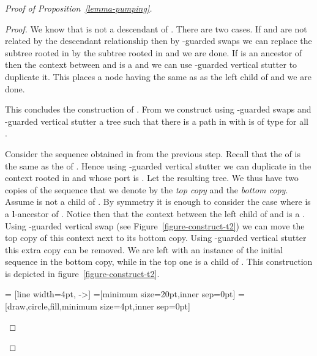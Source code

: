 \begin{proof}[Proof of Proposition~\ref{lemma-pumping}]
\begin{proof}
  We know that  is not a descendant of . There are two cases. If  and 
  are not related by the descendant relationship then by -guarded swaps we
  can replace the subtree rooted in  by the subtree rooted in  and we
  are done. If  is an ancestor of  then the context between  and 
  is a \kloop and we can use -guarded vertical stutter to duplicate
  it. This places a node having the same  as  as the left child of  and we are done.

  \noindent This concludes the construction of . From  we construct using
  -guarded swaps and -guarded vertical stutter a tree  such that
  there is a path  in  with  is of type 
  for all .

  Consider the sequence  obtained in  from the previous
  step. Recall that the \ktype of  is the same as the \ktype of .
  Hence using -guarded vertical stutter we can duplicate in  the
  context rooted in  and whose port is . Let  the resulting
  tree. We thus have two copies of the sequence  that we denote
  by the \emph{top copy} and the \emph{bottom copy}. Assume  is not a
  child of . By symmetry it is enough to consider the case where
   is a {\bf l}-ancestor of . Notice then that the context
  between the left child of  and  is a \kloop. Using -guarded
  vertical swap (see Figure~\ref{figure-construct-t2}) we can move the top copy
  of this context next to its bottom copy. Using -guarded vertical stutter
  this extra copy can be removed. We are left with an instance of the initial
  sequence in the bottom copy, while in the top one  is a child of
  .  This construction is depicted in
  figure~\ref{figure-construct-t2}.

 = [line width=4pt, ->]
=[minimum size=20pt,inner sep=0pt]
=[draw,circle,fill,minimum size=4pt,inner sep=0pt]

\begin{figure}
\begin{center}
\end{center}
\end{figure}
\end{proof}
\end{proof}
